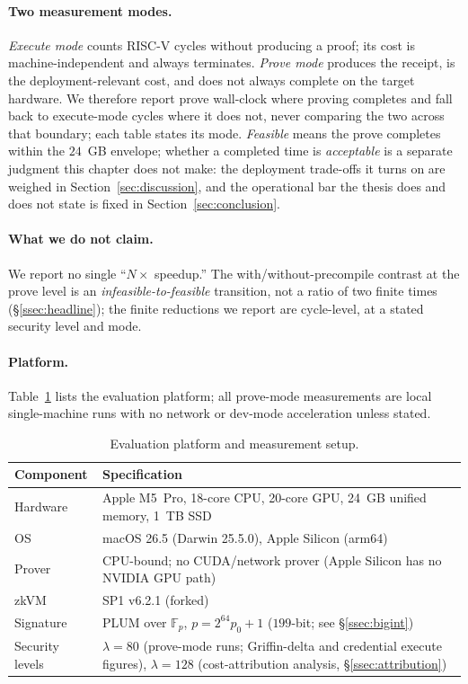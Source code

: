 \paragraph{Two measurement modes.}
\emph{Execute mode} counts RISC-V cycles without producing a proof; its cost is machine-independent and always terminates. \emph{Prove mode} produces the receipt, is the deployment-relevant cost, and does not always complete on the target hardware. We therefore report prove wall-clock where proving completes and fall back to execute-mode cycles where it does not, never comparing the two across that boundary; each table states its mode. \emph{Feasible} means the prove completes within the $24$~GB envelope; whether a completed time is \emph{acceptable} is a separate judgment this chapter does not make: the deployment trade-offs it turns on are weighed in Section~\ref{sec:discussion}, and the operational bar the thesis does and does not state is fixed in Section~\ref{sec:conclusion}.

\paragraph{What we do not claim.}
We report no single ``$N\times$ speedup.'' The with/without-precompile contrast at the prove level is an \emph{infeasible-to-feasible} transition, not a ratio of two finite times (\S\ref{ssec:headline}); the finite reductions we report are cycle-level, at a stated security level and mode.

\paragraph{Platform.}
Table~\ref{tab:platform} lists the evaluation platform; all prove-mode measurements are local single-machine runs with no network or dev-mode acceleration unless stated.

\begin{table}[H]
\centering
\small
\begin{tabular}{ll}
\toprule
Component & Specification \\
\midrule
Hardware & Apple M5~Pro, 18-core CPU, 20-core GPU, 24~GB unified memory, 1~TB SSD \\
OS & macOS 26.5 (Darwin 25.5.0), Apple Silicon (arm64) \\
Prover & CPU-bound; no CUDA/network prover (Apple Silicon has no NVIDIA GPU path) \\
zkVM & SP1 v6.2.1 (forked) \\
Signature & PLUM over $\mathbb{F}_p$, $p=2^{64}p_0+1$ ($199$-bit; see \S\ref{ssec:bigint}) \\
Security levels & $\lambda=80$ (prove-mode runs; Griffin-delta and credential execute figures), $\lambda=128$ (cost-attribution analysis, \S\ref{ssec:attribution}) \\
\bottomrule
\end{tabular}
\caption{Evaluation platform and measurement setup.}
\label{tab:platform}
\end{table}

